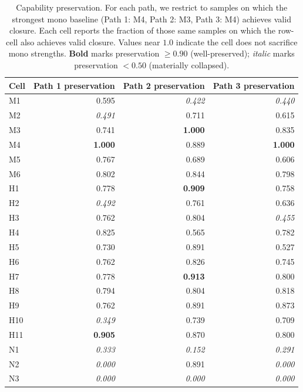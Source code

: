 \begin{table}[!htbp]
\centering
\small
\caption{Capability preservation. For each path, we restrict to samples on which the strongest mono baseline (Path 1: M4, Path 2: M3, Path 3: M4) achieves valid closure. Each cell reports the fraction of those same samples on which the row-cell also achieves valid closure. Values near $1.0$ indicate the cell does not sacrifice mono strengths. \textbf{Bold} marks preservation $\geq 0.90$ (well-preserved); \emph{italic} marks preservation $< 0.50$ (materially collapsed).}
\label{tab:capability_preservation}
\begin{tabular}{lrrr}
\toprule
Cell & Path 1 preservation & Path 2 preservation & Path 3 preservation \\
\midrule
M1 & 0.595 & \emph{0.422} & \emph{0.440} \\
M2 & \emph{0.491} & 0.711 & 0.615 \\
M3 & 0.741 & \textbf{1.000} & 0.835 \\
M4 & \textbf{1.000} & 0.889 & \textbf{1.000} \\
M5 & 0.767 & 0.689 & 0.606 \\
M6 & 0.802 & 0.844 & 0.798 \\
\midrule
H1 & 0.778 & \textbf{0.909} & 0.758 \\
H2 & \emph{0.492} & 0.761 & 0.636 \\
H3 & 0.762 & 0.804 & \emph{0.455} \\
H4 & 0.825 & 0.565 & 0.782 \\
H5 & 0.730 & 0.891 & 0.527 \\
H6 & 0.762 & 0.826 & 0.745 \\
H7 & 0.778 & \textbf{0.913} & 0.800 \\
H8 & 0.794 & 0.804 & 0.818 \\
H9 & 0.762 & 0.891 & 0.873 \\
H10 & \emph{0.349} & 0.739 & 0.709 \\
H11 & \textbf{0.905} & 0.870 & 0.800 \\
\midrule
N1 & \emph{0.333} & \emph{0.152} & \emph{0.291} \\
N2 & \emph{0.000} & 0.891 & \emph{0.000} \\
N3 & \emph{0.000} & \emph{0.000} & \emph{0.000} \\
\bottomrule
\end{tabular}
\end{table}